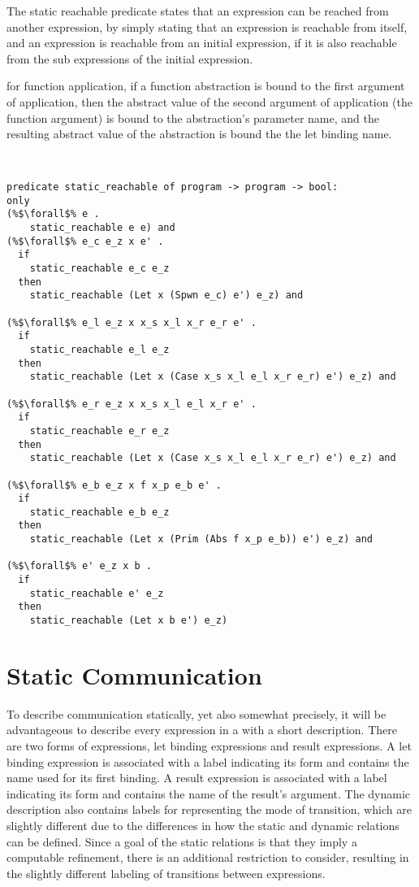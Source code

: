 \documentclass{article}
\begin{document}
The static reachable predicate states that an expression can be reached from another
expression, by simply stating that an expression is reachable from itself,  and an expression
is reachable from an initial expression, if it is also reachable from the sub expressions of
the initial expression.  

for function application, if a function abstraction is bound to the first argument of
application, then the abstract value of the second argument of application (the function
argument) is bound to the abstraction's parameter name, and the resulting abstract value of the
abstraction is bound the the let binding name.

\begin{lstlisting}[language=logic, style=codestyle1, escapechar=\%]


predicate static_reachable of program -> program -> bool:
only
(%$\forall$% e .
    static_reachable e e) and
(%$\forall$% e_c e_z x e' . 
  if
    static_reachable e_c e_z
  then
    static_reachable (Let x (Spwn e_c) e') e_z) and

(%$\forall$% e_l e_z x x_s x_l x_r e_r e' . 
  if
    static_reachable e_l e_z
  then
    static_reachable (Let x (Case x_s x_l e_l x_r e_r) e') e_z) and

(%$\forall$% e_r e_z x x_s x_l e_l x_r e' . 
  if
    static_reachable e_r e_z
  then
    static_reachable (Let x (Case x_s x_l e_l x_r e_r) e') e_z) and

(%$\forall$% e_b e_z x f x_p e_b e' . 
  if
    static_reachable e_b e_z
  then
    static_reachable (Let x (Prim (Abs f x_p e_b)) e') e_z) and

(%$\forall$% e' e_z x b . 
  if
    static_reachable e' e_z
  then
    static_reachable (Let x b e') e_z)

\end{lstlisting}


\section{Static Communication}

To describe communication statically, yet also somewhat precisely, it will be advantageous to
describe every expression in a with a short description.  There are two forms of expressions,
let binding expressions and result expressions.  A let binding expression is associated with a
label indicating its form and contains the name used for its first binding. A result
expression is associated with a label indicating its form and contains the name of the result's
argument.  The dynamic description also contains labels for representing the mode of
transition, which are slightly different due to the differences in how the static and dynamic
relations can be defined.  Since a goal of the static relations is that they imply a computable
refinement, there is an additional restriction to consider, resulting in the slightly different
labeling of transitions between expressions.    
\end{document}
